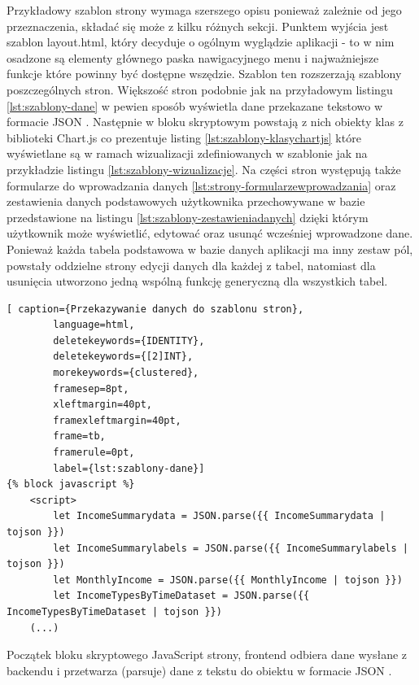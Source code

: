 \documentclass[a4paper,10pt, twoside]{report}
\begin{document}
\begin{large}
{Przykładowy szablon strony wymaga szerszego opisu ponieważ zależnie od jego 
przeznaczenia, składać się może z kilku różnych sekcji. Punktem wyjścia jest 
szablon layout.html, który decyduje o ogólnym wyglądzie aplikacji - to w nim 
osadzone są elementy głównego paska nawigacyjnego menu i najważniejsze funkcje 
które powinny być dostępne wszędzie. Szablon ten rozszerzają szablony 
poszczególnych stron. Większość stron podobnie jak na przyładowym listingu 
\ref*{lst:szablony-dane} w pewien sposób wyświetla dane przekazane tekstowo w 
formacie JSON \cite{JSON}. Następnie w bloku skryptowym powstają z nich obiekty 
klas z biblioteki Chart.js \cite{chart.js} co prezentuje listing 
\ref*{lst:szablony-klasychartjs} które wyświetlane są w ramach wizualizacji 
zdefiniowanych w szablonie jak na przykładzie listingu 
\ref*{lst:szablony-wizualizacje}. Na części stron występują także formularze do 
wprowadzania danych \ref*{lst:strony-formularzewprowadzania} oraz zestawienia 
danych podstawowych użytkownika przechowywane w bazie przedstawione na listingu 
\ref*{lst:szablony-zestawieniadanych} dzięki którym użytkownik może wyświetlić, 
edytować oraz usunąć wcześniej wprowadzone dane. Ponieważ każda tabela 
podstawowa w bazie danych aplikacji ma inny zestaw pól, powstały oddzielne 
strony edycji danych dla każdej z tabel, natomiast dla usunięcia utworzono 
jedną wspólną funkcję generyczną dla wszystkich tabel.}

\begin{minipage}{\textwidth}
    \begin{lstlisting}[ caption={Przekazywanie danych do szablonu stron},
        language=html,
        deletekeywords={IDENTITY},
        deletekeywords={[2]INT},
        morekeywords={clustered},
        framesep=8pt,
        xleftmargin=40pt,
        framexleftmargin=40pt,
        frame=tb,
        framerule=0pt,
        label={lst:szablony-dane}]
{% block javascript %}
    <script>
        let IncomeSummarydata = JSON.parse({{ IncomeSummarydata | tojson }})
        let IncomeSummarylabels = JSON.parse({{ IncomeSummarylabels | tojson }})
        let MonthlyIncome = JSON.parse({{ MonthlyIncome | tojson }})
        let IncomeTypesByTimeDataset = JSON.parse({{ IncomeTypesByTimeDataset | tojson }})
    (...)\end{lstlisting}
\end{minipage}
{Początek bloku skryptowego JavaScript \cite{JavaScript} strony, frontend 
odbiera dane wysłane z backendu i przetwarza (parsuje) dane z tekstu do obiektu 
w formacie JSON \cite{JSON}.}


\end{large}
\end{document}
